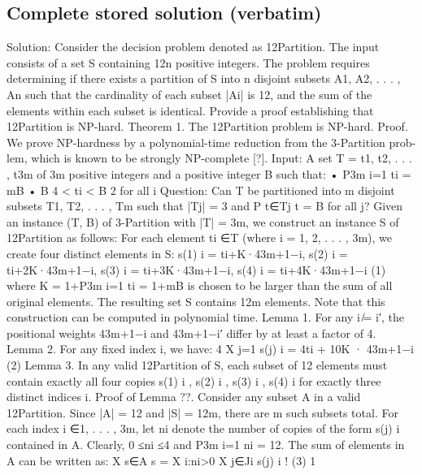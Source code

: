 \documentclass[11pt]{article}
\begin{document}
\subsection*{Complete stored solution (verbatim)}
\begin{Vsrc}
Solution:
Consider the decision problem denoted as 12Partition. The input consists of
a set S containing 12n positive integers. The problem requires determining if there exists a
partition of S into n disjoint subsets A1, A2, . . . , An such that the cardinality of each subset
|Ai| is 12, and the sum of the elements within each subset is identical. Provide a proof
establishing that 12Partition is NP-hard.
Theorem 1. The 12Partition problem is NP-hard.
Proof. We prove NP-hardness by a polynomial-time reduction from the 3-Partition prob-
lem, which is known to be strongly NP-complete [?].
Input: A set T = {t1, t2, . . . , t3m} of 3m positive integers and a positive integer B such
that:
• P3m
i=1 ti = mB
•
B
4 < ti < B
2 for all i
Question: Can T be partitioned into m disjoint subsets T1, T2, . . . , Tm such that |Tj| = 3
and P
t∈Tj t = B for all j?
Given an instance (T, B) of 3-Partition with |T| = 3m, we construct an instance S of
12Partition as follows:
For each element ti ∈T (where i = 1, 2, . . . , 3m), we create four distinct elements in S:
s(1)
i
= ti+K·43m+1−i,
s(2)
i
= ti+2K·43m+1−i,
s(3)
i
= ti+3K·43m+1−i,
s(4)
i
= ti+4K·43m+1−i
(1)
where K = 1+P3m
i=1 ti = 1+mB is chosen to be larger than the sum of all original elements.
The resulting set S contains 12m elements. Note that this construction can be computed
in polynomial time.
Lemma 1. For any i ̸= i′, the positional weights 43m+1−i and 43m+1−i′ differ by at least a
factor of 4.
Lemma 2. For any fixed index i, we have:
4
X
j=1
s(j)
i
= 4ti + 10K · 43m+1−i
(2)
Lemma 3. In any valid 12Partition of S, each subset of 12 elements must contain exactly
all four copies s(1)
i , s(2)
i , s(3)
i , s(4)
i
for exactly three distinct indices i.
Proof of Lemma ??. Consider any subset A in a valid 12Partition.
Since |A| = 12 and
|S| = 12m, there are m such subsets total.
For each index i ∈{1, . . . , 3m}, let ni denote the number of copies of the form s(j)
i
contained in A. Clearly, 0 ≤ni ≤4 and P3m
i=1 ni = 12.
The sum of elements in A can be written as:
X
s∈A
s =
X
i:ni>0
X
j∈Ji
s(j)
i
!
(3)
1


\end{Vsrc}
\end{document}
